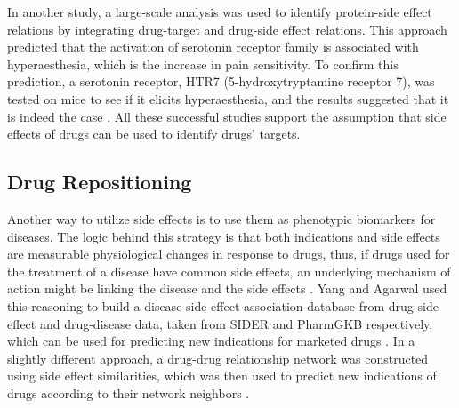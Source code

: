 In another study, a large-scale analysis was used to identify protein-side effect relations by integrating drug-target and drug-side effect relations. This approach predicted that the activation of serotonin receptor family is associated with hyperaesthesia, which is the increase in pain sensitivity. To confirm this prediction, a serotonin receptor, HTR7 (5-hydroxytryptamine receptor 7), was tested on mice to see if it elicits hyperaesthesia, and the results suggested that it is indeed the case \cite{kuhn_systematic_2014}. All these successful studies support the assumption that side effects of drugs can be used to identify drugs' targets.

\subsection{Drug Repositioning}
Another way to utilize side effects is to use them as phenotypic biomarkers for diseases. The logic behind this strategy is that both indications and side effects are measurable physiological changes in response to drugs, thus, if drugs used for the treatment of a disease have common side effects, an underlying mechanism of action might be linking the disease and the side effects \cite{yang_systematic_2011}. Yang and Agarwal used this reasoning to build a disease-side effect association database from drug-side effect and drug-disease data, taken from \ac{SIDER} and PharmGKB respectively, which can be used for predicting new indications for marketed drugs \cite{yang_systematic_2011}. In a slightly different approach, a drug-drug relationship network was constructed using side effect similarities, which was then used to predict new indications of drugs according to their network neighbors \cite{ye_construction_2014}.
